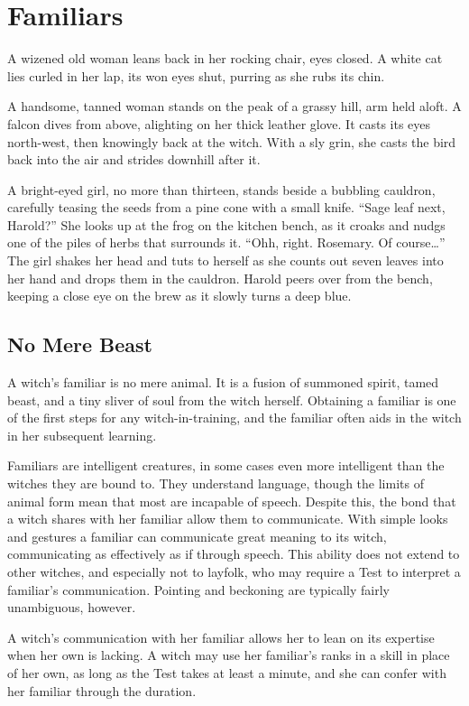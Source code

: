 \chapter{Familiars}

A wizened old woman leans back in her rocking chair, eyes closed.
A white cat lies curled in her lap, its won eyes shut, purring as she rubs its chin.

A handsome, tanned woman stands on the peak of a grassy hill, arm held aloft.
A falcon dives from above, alighting on her thick leather glove.
It casts its eyes north-west, then knowingly back at the witch.
With a sly grin, she casts the bird back into the air and strides downhill after it.

A bright-eyed girl, no more than thirteen, stands beside a bubbling cauldron, carefully teasing the seeds from a pine cone with a small knife.
``Sage leaf next, Harold?''
She looks up at the frog on the kitchen bench, as it croaks and nudgs one of the piles of herbs that surrounds it.
``Ohh, right. Rosemary. Of course{\dots}''
The girl shakes her head and tuts to herself as she counts out seven leaves into her hand and drops them in the cauldron.
Harold peers over from the bench, keeping a close eye on the brew as it slowly turns a deep blue.

\section{No Mere Beast}

A witch's familiar is no mere animal.
It is a fusion of summoned spirit, tamed beast, and a tiny sliver of soul from the witch herself.
Obtaining a familiar is one of the first steps for any witch-in-training, and the familiar often aids in the witch in her subsequent learning.

Familiars are intelligent creatures, in some cases even more intelligent than the witches they are bound to.
They understand language, though the limits of animal form mean that most are incapable of speech.
Despite this, the bond that a witch shares with her familiar allow them to communicate.
With simple looks and gestures a familiar can communicate great meaning to its witch, communicating as effectively as if through speech.
This ability does not extend to other witches, and especially not to layfolk, who may require a Test to interpret a familiar's communication.
Pointing and beckoning are typically fairly unambiguous, however.

A witch's communication with her familiar allows her to lean on its expertise when her own is lacking.
A witch may use her familiar's ranks in a skill in place of her own, as long as the Test takes at least a minute, and she can confer with her familiar through the duration.

